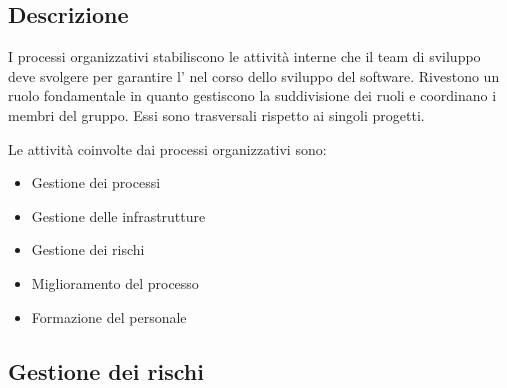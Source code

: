 \documentclass[../norme-di-progetto.tex]{subfiles}
\begin{document}
\subsection{Descrizione}%
\label{sub:Descrizione}

I processi organizzativi stabiliscono le attività interne che il team di sviluppo deve svolgere per garantire l' nel corso dello sviluppo del software.
Rivestono un ruolo fondamentale in quanto gestiscono la suddivisione dei ruoli e coordinano i membri del gruppo.
Essi sono trasversali rispetto ai singoli progetti.

Le attività coinvolte dai processi organizzativi sono:

\begin{itemize}
  \item Gestione dei processi
  \item Gestione delle infrastrutture
  \item Gestione dei rischi
  \item Miglioramento del processo
  \item Formazione del personale
\end{itemize}

\subsection{Gestione dei rischi}%
\label{sub:gestione dei rischi}
\end{document}
